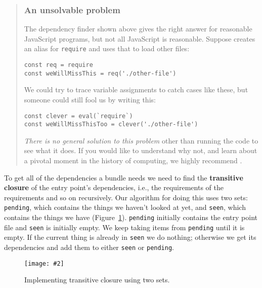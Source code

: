 \documentclass[krantzl]{krantz}
\newcommand{\figpdf}[4]{\begin{figure}%
\centering%
\texttt{[image: \#2]}%
\caption{#3}%
\label{#1}%
\end{figure}}
\newcommand{\figref}[1]{Figure~\ref{#1}}
\newcommand{\glossref}[1]{\textbf{#1}}
\newenvironment{callout}{\savenotes\begin{tBox}\begin{quotation}\toggletrue{inbox}\renewcommand{\thempfootnote}{\arabic{footnote}}}{\end{quotation}\vspace{\baselineskip}\end{tBox}\togglefalse{inbox}\spewnotes}
\begin{document}
\begin{callout}


\subsubsection*{An unsolvable problem}


The dependency finder shown above gives the right answer for reasonable JavaScript programs,
but not all JavaScript is reasonable.
Suppose creates an alias for \texttt{require} and uses that to load other files:

\begin{lstlisting}[frame=single,frameround=tttt]
const req = require
const weWillMissThis = req('./other-file')
\end{lstlisting}


We could try to trace variable assignments to catch cases like these,
but someone could still fool us by writing this:

\begin{lstlisting}[frame=single,frameround=tttt]
const clever = eval(`require`)
const weWillMissThisToo = clever('./other-file')
\end{lstlisting}


\emph{There is no general solution to this problem}
other than running the code to see what it does.
If you would like to understand why not,
and learn about a pivotal moment in the history of computing,
we highly recommend \cite{Petzold2008}.

\end{callout}


To get all of the dependencies a bundle needs
we need to find the \glossref{transitive closure} of the entry point's dependencies,
i.e.,
the requirements of the requirements and so on recursively.
Our algorithm for doing this uses two sets:
\texttt{pending},
which contains the things we haven't looked at yet,
and \texttt{seen},
which contains the things we have
(\figref{module-bundler-transitive-closure}).
\texttt{pending} initially contains the entry point file and \texttt{seen} is initially empty.
We keep taking items from \texttt{pending} until it is empty.
If the current thing is already in \texttt{seen} we do nothing;
otherwise we get its dependencies and add them to either \texttt{seen} or \texttt{pending}.

\figpdf{module-bundler-transitive-closure}{./module-bundler/transitive-closure.pdf}{Implementing transitive closure using two sets.}{0.6}
\end{document}

